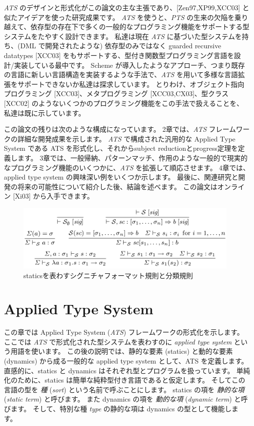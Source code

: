 \documentclass[submit,techreq,noauthor,onecolumn]{ipsj}
\begin{document}
{\it ATS} のデザインと形式化がこの論文の主な主張であり、[Zen97,XP99,XCC03] と似たアイデアを使った研究成果です。
{\it ATS} を使うと、{\it PTS} の生来の欠陥を乗り越えて、依存型の存在下で多くの一般的なプログラミング機能をサポートする型システムをたやすく設計できます。
私達は現在 {\it ATS} に基づいた型システムを持ち、(DML で開発されたような) 依存型のみではなく guarded recursive datatypes [XCC03] をもサポートする、型付き関数型プログラミング言語を設計/実装している最中です。
Scheme が導入したようなアプローチ、つまり既存の言語に新しい言語構造を実装するような手法で、{\it ATS} を用いて多様な言語拡張をサポートできないか私達は探求しています。
とりわけ、オブジェクト指向プログラミング [XCC03]、メタプログラミング [XCC03,CX03]、型クラス [XCC02] のようないくつかのプログラミング機能をこの手法で扱えることを、私達は既に示しています。

この論文の残りは次のような構成になっています。
2章では、{\it ATS} フレームワークの詳細な開発成果を示します。
{\it ATS} で構成された汎用的な Applied Type System である ATS を形式化し、それからsubject reductionとprogress定理を定義します。
3章では、一般帰納、パターンマッチ、作用のような一般的で現実的なプログラミング機能のいくつかに、{\it ATS} を拡張して順応させます。
4章では、applied type system の興味深い例をいくつか示します。
最後に、関連研究と開発の将来の可能性について紹介した後、結論を述べます。
この論文はオンライン [Xi03] から入手できます。

\begin{figure}[h]
\centering
\includegraphics[width=11cm]{img/fig1_rules.png}
\caption{staticsを表わすシグニチャフォーマット規則と分類規則}
\label{fig:fig1_rules}
\end{figure}

\section{Applied Type System}

この章では Applied Type System ({\it ATS}) フレームワークの形式化を示します。
ここでは {\it ATS} で形式化された型システムを表わすのに {\it applied type system} という用語を使います。
この後の説明では、静的な要素 (statics) と動的な要素 (dynamics) から成る一般的な applied type system として、ATS を定義します。
直感的に、statics と dynamics はそれぞれ型とプログラムを扱っています。
単純化のために、statics は簡単な純粋型付き言語であると仮定します。
そしてこの言語の型を {\it 種} ({\it sort}) という名前で呼ぶことにします。
statics の項を {\it 静的な項} ({\it static term}) と呼びます。
また dynamics の項を {\it 動的な項} ({\it dynamic term}) と呼びます。
そして、特別な種 {\it type} の静的な項は dynamics の型として機能します。
\end{document}
